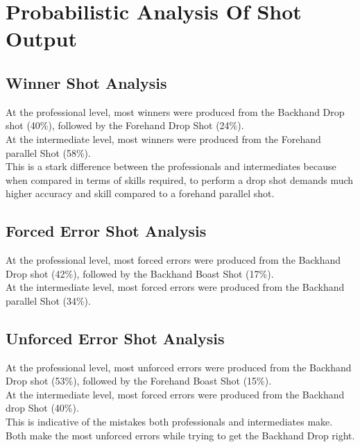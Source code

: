 \documentclass[10pt,conference]{IEEEtran}
\begin{document}
\section{Probabilistic Analysis Of Shot Output}
\label{sec:Probabilistic Analysis}

\subsection{Winner Shot Analysis}
At the professional level, most winners were produced from the Backhand Drop shot (40\%), followed by the Forehand Drop Shot (24\%).
\\At the intermediate level, most winners were produced from the Forehand parallel Shot (58\%).
\\This is a stark difference between the professionals and intermediates because when compared in terms of skills required, to perform a drop shot demands much higher accuracy and skill compared to a forehand parallel shot.

\subsection{Forced Error Shot Analysis}
At the professional level, most forced errors were produced from the Backhand Drop shot (42\%), followed by the Backhand Boast Shot (17\%).
\\At the intermediate level, most forced errors were produced from the Backhand parallel Shot (34\%).

\subsection{Unforced Error Shot Analysis}
At the professional level, most unforced errors were produced from the Backhand Drop shot (53\%), followed by the Forehand Boast Shot (15\%).
\\At the intermediate level, most forced errors were produced from the Backhand drop Shot (40\%).
\\This is indicative of the mistakes both professionals and intermediates make. Both make the most unforced errors while trying to get the Backhand Drop right.
\end{document}
